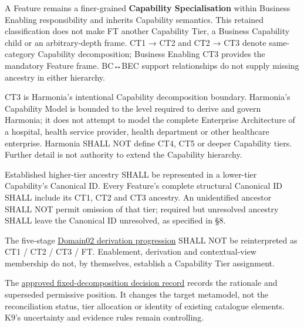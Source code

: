 \label{rad:metamodel:63}

A Feature remains a finer-grained \textbf{Capability Specialisation} within Business Enabling responsibility and inherits Capability semantics. This retained classification does not make FT another Capability Tier, a Business Capability child or an arbitrary-depth frame. CT1 → CT2 and CT2 → CT3 denote same-category Capability decomposition; Business Enabling CT3 provides the mandatory Feature frame. BC↔BEC support relationships do not supply missing ancestry in either hierarchy.

\label{rad:metamodel:65}

CT3 is Harmonia's intentional Capability decomposition boundary. Harmonia's Capability Model is bounded to the level required to derive and govern Harmonia; it does not attempt to model the complete Enterprise Architecture of a hospital, health service provider, health department or other healthcare enterprise. Harmonia SHALL NOT define CT4, CT5 or deeper Capability tiers. Further detail is not authority to extend the Capability hierarchy.

\label{rad:metamodel:67}

Established higher-tier ancestry SHALL be represented in a lower-tier Capability's Canonical ID. Every Feature's complete structural Canonical ID SHALL include its CT1, CT2 and CT3 ancestry. An unidentified ancestor SHALL NOT permit omission of that tier; required but unresolved ancestry SHALL leave the Canonical ID unresolved, as specified in §8.

\label{rad:metamodel:69}

The five-stage \hyperref[rad:tier-model]{Domain02 derivation progression} SHALL NOT be reinterpreted as CT1 /\allowbreak{} CT2 /\allowbreak{} CT3 /\allowbreak{} FT. Enablement, derivation and contextual-view membership do not, by themselves, establish a Capability Tier assignment.

\label{rad:metamodel:71}

The \href{https://github.com/fhirfactory/harmonia/blob/98410db60155198a75f74c79d98060070209faa1/docs/markdown/02-strategy/reviews/fixed-capability-decomposition-decision.md}{approved fixed-decomposition decision record} records the rationale and superseded permissive position. It changes the target metamodel, not the reconciliation status, tier allocation or identity of existing catalogue elements. K9's uncertainty and evidence rules remain controlling.

